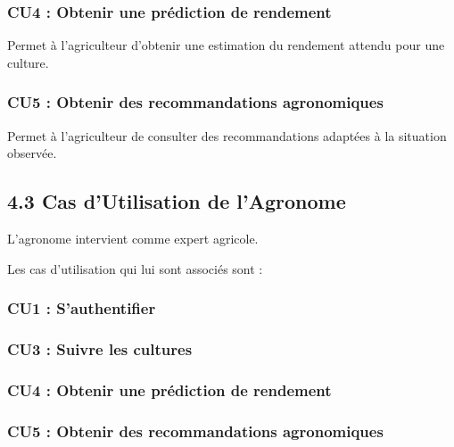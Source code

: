 \documentclass[
]{article}
\begin{document}
\hypertarget{cu4-obtenir-une-pruxe9diction-de-rendement}{%
\subsubsection{CU4 : Obtenir une prédiction de
rendement}\label{cu4-obtenir-une-pruxe9diction-de-rendement}}

Permet à l'agriculteur d'obtenir une estimation du rendement attendu
pour une culture.

\hypertarget{cu5-obtenir-des-recommandations-agronomiques}{%
\subsubsection{CU5 : Obtenir des recommandations
agronomiques}\label{cu5-obtenir-des-recommandations-agronomiques}}

Permet à l'agriculteur de consulter des recommandations adaptées à la
situation observée.

\hypertarget{cas-dutilisation-de-lagronome}{%
\subsection{4.3 Cas d'Utilisation de
l'Agronome}\label{cas-dutilisation-de-lagronome}}

L'agronome intervient comme expert agricole.

Les cas d'utilisation qui lui sont associés sont :

\hypertarget{cu1-sauthentifier-1}{%
\subsubsection{CU1 : S'authentifier}\label{cu1-sauthentifier-1}}

\hypertarget{cu3-suivre-les-cultures-1}{%
\subsubsection{CU3 : Suivre les
cultures}\label{cu3-suivre-les-cultures-1}}

\hypertarget{cu4-obtenir-une-pruxe9diction-de-rendement-1}{%
\subsubsection{CU4 : Obtenir une prédiction de
rendement}\label{cu4-obtenir-une-pruxe9diction-de-rendement-1}}

\hypertarget{cu5-obtenir-des-recommandations-agronomiques-1}{%
\subsubsection{CU5 : Obtenir des recommandations
agronomiques}\label{cu5-obtenir-des-recommandations-agronomiques-1}}
\end{document}
